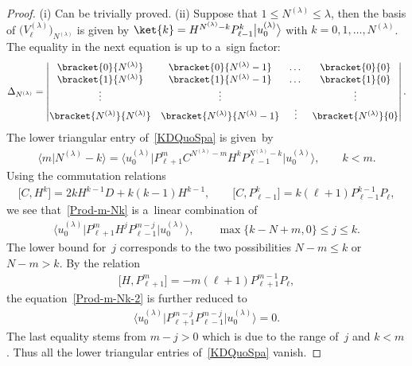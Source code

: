 \begin{proof}
(i) Can be trivially proved.
 (ii) Suppose that $ 1 \leq N^{(\lambda)} \leq \lambda$, then the basis of $
\big(V_{\ell}^{(\lambda)}\big)_{N^{(\lambda)}} $ is given by $ \ket{k} = H^{N^{(\lambda)}-k} P_{\ell-1}^k \big|u_0^{(\lambda)}\big\rangle
$ with $ k = 0, 1, \dots, N^{(\lambda)}$.
The equality in the next equation is up to a~sign factor:
\begin{gather}
\Delta_{N^{(\lambda)}} = \left|
\begin{matrix} \bracket{0}{N^{(\lambda)}} & \bracket{0}{N^{(\lambda)}-1} & \dots & \bracket{0}{0}
\\ \bracket{1}{N^{(\lambda)}} & \bracket{1}{N^{(\lambda)}-1} & \dots & \bracket{1}{0}
\\
\vdots & \vdots & & \vdots
\\
\bracket{N^{(\lambda)}}{N^{(\lambda)}} & \bracket{N^{(\lambda)}}{N^{(\lambda)}-1} & \vdots & \bracket{N^{(\lambda)}}{0}
\end{matrix}
\right|.
\label{KDQuoSpa}
\end{gather}
The lower triangular entry of~\eqref{KDQuoSpa} is given~by
\begin{gather}
\big\langle m \big|  N^{(\lambda)}-k\big\rangle  = \big\langle u_0^{(\lambda)}\big| P_{\ell+1}^m C^{N^{(\lambda)}-m} H^k P_{\ell-1}^{N^{(\lambda)}-k}
\big|u_0^{(\lambda)}\big\rangle ,
\qquad
k < m.
\label{Prod-m-Nk}
\end{gather}
Using the commutation relations
\begin{gather*}
\big[C, H^k\big] = 2k H^{k-1} D + k(k-1) H^{k-1},
\qquad
\big[C, P_{\ell-1}^k\big] = k (\ell+1) P_{\ell-1}^{k-1} P_{\ell},
\end{gather*}
we see that~\eqref{Prod-m-Nk} is a~linear combination of
\begin{gather}
\big\langle u_0^{(\lambda)}\big| P_{\ell+1}^m H^j P_{\ell-1}^{m-j} \big|u_0^{(\lambda)}\big\rangle ,
\qquad
\max\{k-N+m, 0\} \leq j \leq k.
\label{Prod-m-Nk-2}
\end{gather}
The lower bound for~$j$ corresponds to the two possibilities $ N-m \leq k $ or $ N-m > k$.
By the relation
\begin{gather*}
\big[H, P_{\ell+1}^m\big] = -m(\ell+1) P_{\ell+1}^{m-1} P_{\ell},
\end{gather*}
the equation~\eqref{Prod-m-Nk-2} is further reduced to
\begin{gather*}
\big\langle u_0^{(\lambda)}\big| P_{\ell+1}^{m-j} P_{\ell-1}^{m-j} \big|u_0^{(\lambda)}\big\rangle  = 0.
\end{gather*}
The last equality stems from $ m -j > 0 $ which is due to the range of~$j$ and $ k < m$.
Thus all the lower triangular entries of~\eqref{KDQuoSpa} vanish.


\end{proof}
